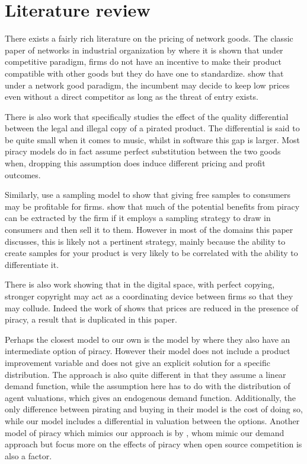 \section{Literature review}

There exists a fairly rich literature on the pricing of network goods. The classic paper of networks in industrial organization by \cite{KS86} where it is shown that under  competitive paradigm, firms do not have an incentive to make their product compatible with other goods but they do have one to standardize. \cite{FT00} show that under a network good paradigm, the incumbent may decide to keep low prices even without a direct competitor as long as the threat of entry exists.

There is also work that specifically studies the effect of the quality differential between the legal and illegal copy of a pirated product\citep{GL03}. The differential is said to be quite small when it comes to music, whilst in software this gap is larger. Most piracy models do in fact assume perfect substitution between the two goods when, dropping this assumption does induce different pricing and profit outcomes.

Similarly, \cite{PW06b} use a sampling model to show that giving free samples to consumers may be profitable for firms. \cite{C05} show that much of the potential benefits from piracy can be extracted by the firm if it employs a sampling strategy to draw in consumers and then sell it to them. However in most of the domains this paper discusses, this is likely not a pertinent strategy, mainly because the ability to create samples for your product is very likely to be correlated with the ability to differentiate it.

There is also work showing that in the digital space, with perfect copying, stronger copyright may act as a coordinating device between firms so that they may collude\citep{J08}. Indeed the work of \cite{S04} shows that prices are reduced in the presence of piracy, a result that is duplicated in this paper.

Perhaps the closest model to our own is the model by \cite{CRP91} where they also have an intermediate option of piracy. However their model does not include a product improvement variable and does not give an explicit solution for a specific distribution. The approach is also quite different in that they assume a linear demand function, while the assumption here has to do with the distribution of agent valuations, which gives an endogenous demand function.  Additionally, the only difference between pirating and buying in their model is the cost of doing so, while our model includes a differential in valuation between the options. Another model of piracy which mimics our approach is by \cite{MRSS17}, whom mimic our demand approach but focus more on the effects of piracy when open source competition is also a factor.

